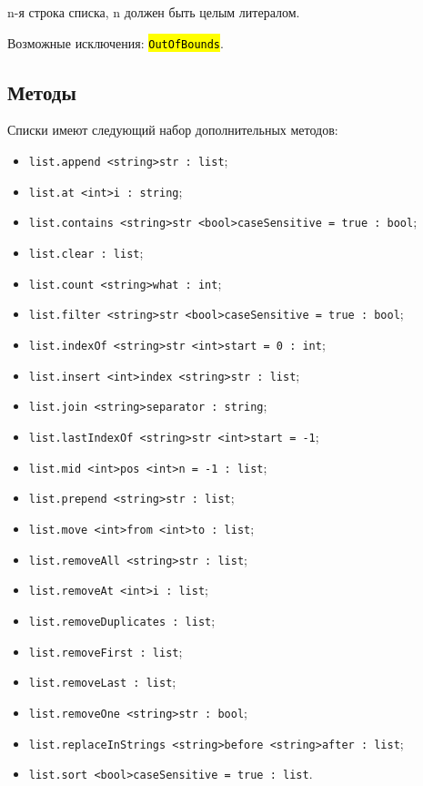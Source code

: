 \documentclass[a4paper, 14pt]{extarticle}
\newcommand{\ferror}[1]{{\fontsize{11pt}{12pt}\tt{\sethlcolor{yellow}\hl{#1}}}}
\newenvironment{icItems}
	{ \begin{itemize} [noitemsep,nolistsep] }
	{ \end{itemize} }
\begin{document}
n-я строка списка, n должен быть целым литералом.

Возможные исключения: \ferror{OutOfBounds}.

\subsection{Методы}

Списки имеют следующий набор дополнительных методов:
\begin{icItems}
\item \lstinline|list.append <string>str : list|;
\item \lstinline|list.at <int>i : string|;
\item \lstinline|list.contains <string>str <bool>caseSensitive = true : bool|;
\item \lstinline|list.clear : list|;
\item \lstinline|list.count <string>what : int|;
\item \lstinline|list.filter <string>str <bool>caseSensitive = true : bool|;
\item \lstinline|list.indexOf <string>str <int>start = 0 : int|;
\item \lstinline|list.insert <int>index <string>str : list|;
\item \lstinline|list.join <string>separator : string|;
\item \lstinline|list.lastIndexOf <string>str <int>start = -1|;
\item \lstinline|list.mid <int>pos <int>n = -1 : list|;
\item \lstinline|list.prepend <string>str : list|;
\item \lstinline|list.move <int>from <int>to : list|;
\item \lstinline|list.removeAll <string>str : list|;
\item \lstinline|list.removeAt <int>i : list|;
\item \lstinline|list.removeDuplicates : list|;
\item \lstinline|list.removeFirst : list|;
\item \lstinline|list.removeLast : list|;
\item \lstinline|list.removeOne <string>str : bool|;
\item \lstinline|list.replaceInStrings <string>before <string>after : list|;
\item \lstinline|list.sort <bool>caseSensitive = true : list|.
\end{icItems}
\end{document}
